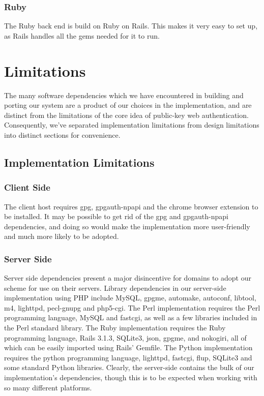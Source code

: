 \documentclass[11pt]{article}
\begin{document}
\subsubsection{Ruby}
The Ruby back end is build on Ruby on Rails. This makes it very easy to set up, as Rails handles all the gems needed for it to run. 

\section{Limitations} \label{sec:limitations}
The many software dependencies which we have encountered in building and porting our system are a product of our choices in the implementation, and are distinct from the limitations of the core idea of public-key web authentication.  Consequently, we've separated implementation limitations from design limitations into distinct sections for convenience.

\subsection{Implementation Limitations}
\subsubsection{Client Side}
The client host requires gpg, gpgauth-npapi and the chrome browser extension to be installed.  It may be possible to get rid of the gpg and gpgauth-npapi dependencies, and doing so would make the implementation more user-friendly and much more likely to be adopted.
\subsubsection{Server Side}
Server side dependencies present a major disincentive for domains to adopt our scheme for use on their servers.  Library dependencies in our server-side implementation using PHP include MySQL, gpgme, automake, autoconf, libtool, m4, lighttpd, pecl-gnupg and php5-cgi.  The Perl implementation requires the Perl programming language, MySQL and fastcgi, as well as a few libraries included in the Perl standard library.  The Ruby implementation requires the Ruby programming language, Rails 3.1.3, SQLite3, json, gpgme, and nokogiri, all of which can be easily imported using Rails' Gemfile.  The Python implementation requires the python programming language, lighttpd, fastcgi, flup, SQLite3 and some standard Python libraries.  Clearly, the server-side contains the bulk of our implementation's dependencies, though this is to be expected when working with so many different platforms.
\end{document}
